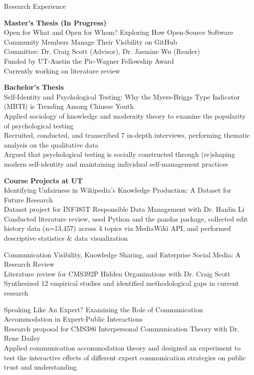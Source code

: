 \documentclass[
	11pt, %
]{resume} %
\begin{document}
\begin{rSection}{Research Experience}

    \textbf{Master's Thesis (In Progress)}\\ 
    Open for What and Open for Whom? Exploring How Open-Source Software Community Members Manage Their Visibility on GitHub\\
\textbullet\enspace Committee: Dr. Craig Scott (Advisor), Dr. Jasmine Wu (Reader)\\
\textbullet\enspace Funded by UT-Austin the Pic-Wagner Fellowship Award\\
\textbullet\enspace Currently working on literature review

    \textbf{Bachelor's Thesis}\\ 
    Self-Identity and Psychological Testing: Why the Myers-Briggs Type Indicator (MBTI) is Trending Among Chinese Youth\\ 
\textbullet\enspace Applied sociology of knowledge and modernity theory to examine the popularity of psychological testing\\
\textbullet\enspace Recruited, conducted, and transcribed 7 in-depth interviews, performing thematic analysis on the qualitative data\\
\textbullet\enspace Argued that psychological testing is socially constructed through (re)shaping modern self-identity and maintaining individual self-management practices


    \textbf{Course Projects at UT}\\ 
    Identifying Unfairness in Wikipedia's Knowledge Production: A Dataset for Future Research\\
\textbullet\enspace Dataset project for INF385T Responsible Data Management with Dr. Hanlin Li\\    
\textbullet\enspace Conducted literature review, used Python and the pandas package, collected edit history data (n=13,457) across 4 topics via MediaWiki API, and performed descriptive statistics \& data visualization

   Communication Visibility, Knowledge Sharing, and Enterprise Social Media: A Research Review\\
\textbullet\enspace Literature review for CMS392P Hidden Organizations with Dr. Craig Scott\\    
\textbullet\enspace Synthesized 12 empirical studies and identified methodological gaps in current research

  Speaking Like An Expert? Examining the Role of Communication Accommodation in Expert-Public Interactions\\
\textbullet\enspace Research proposal for CMS386 Interpersonal Communication Theory with Dr. Rene Dailey\\    
\textbullet\enspace Applied communication accommodation theory and designed an experiment to test the interactive effects of different expert communication strategies on public trust and understanding


\end{rSection}
\end{document}
